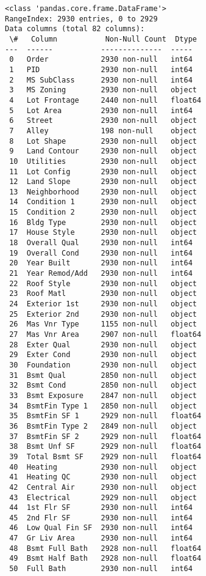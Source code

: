 \documentclass[11pt]{article}
\begin{document}
    \begin{Verbatim}[commandchars=\\\{\}]
<class 'pandas.core.frame.DataFrame'>
RangeIndex: 2930 entries, 0 to 2929
Data columns (total 82 columns):
 \#   Column           Non-Null Count  Dtype
---  ------           --------------  -----
 0   Order            2930 non-null   int64
 1   PID              2930 non-null   int64
 2   MS SubClass      2930 non-null   int64
 3   MS Zoning        2930 non-null   object
 4   Lot Frontage     2440 non-null   float64
 5   Lot Area         2930 non-null   int64
 6   Street           2930 non-null   object
 7   Alley            198 non-null    object
 8   Lot Shape        2930 non-null   object
 9   Land Contour     2930 non-null   object
 10  Utilities        2930 non-null   object
 11  Lot Config       2930 non-null   object
 12  Land Slope       2930 non-null   object
 13  Neighborhood     2930 non-null   object
 14  Condition 1      2930 non-null   object
 15  Condition 2      2930 non-null   object
 16  Bldg Type        2930 non-null   object
 17  House Style      2930 non-null   object
 18  Overall Qual     2930 non-null   int64
 19  Overall Cond     2930 non-null   int64
 20  Year Built       2930 non-null   int64
 21  Year Remod/Add   2930 non-null   int64
 22  Roof Style       2930 non-null   object
 23  Roof Matl        2930 non-null   object
 24  Exterior 1st     2930 non-null   object
 25  Exterior 2nd     2930 non-null   object
 26  Mas Vnr Type     1155 non-null   object
 27  Mas Vnr Area     2907 non-null   float64
 28  Exter Qual       2930 non-null   object
 29  Exter Cond       2930 non-null   object
 30  Foundation       2930 non-null   object
 31  Bsmt Qual        2850 non-null   object
 32  Bsmt Cond        2850 non-null   object
 33  Bsmt Exposure    2847 non-null   object
 34  BsmtFin Type 1   2850 non-null   object
 35  BsmtFin SF 1     2929 non-null   float64
 36  BsmtFin Type 2   2849 non-null   object
 37  BsmtFin SF 2     2929 non-null   float64
 38  Bsmt Unf SF      2929 non-null   float64
 39  Total Bsmt SF    2929 non-null   float64
 40  Heating          2930 non-null   object
 41  Heating QC       2930 non-null   object
 42  Central Air      2930 non-null   object
 43  Electrical       2929 non-null   object
 44  1st Flr SF       2930 non-null   int64
 45  2nd Flr SF       2930 non-null   int64
 46  Low Qual Fin SF  2930 non-null   int64
 47  Gr Liv Area      2930 non-null   int64
 48  Bsmt Full Bath   2928 non-null   float64
 49  Bsmt Half Bath   2928 non-null   float64
 50  Full Bath        2930 non-null   int64

\end{Verbatim}
\end{document}

